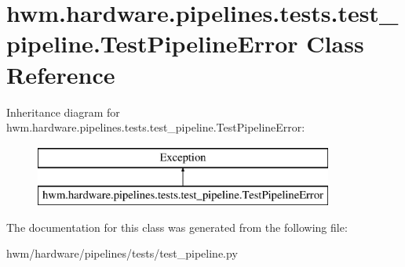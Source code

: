 \hypertarget{classhwm_1_1hardware_1_1pipelines_1_1tests_1_1test__pipeline_1_1_test_pipeline_error}{\section{hwm.\-hardware.\-pipelines.\-tests.\-test\-\_\-pipeline.\-Test\-Pipeline\-Error Class Reference}
\label{classhwm_1_1hardware_1_1pipelines_1_1tests_1_1test__pipeline_1_1_test_pipeline_error}
}
Inheritance diagram for hwm.\-hardware.\-pipelines.\-tests.\-test\-\_\-pipeline.\-Test\-Pipeline\-Error\-:\begin{figure}[H]
\begin{center}
\leavevmode
\includegraphics[height=2.000000cm]{classhwm_1_1hardware_1_1pipelines_1_1tests_1_1test__pipeline_1_1_test_pipeline_error}
\end{center}
\end{figure}


The documentation for this class was generated from the following file\-:\begin{DoxyCompactItemize}
\item 
hwm/hardware/pipelines/tests/test\-\_\-pipeline.\-py\end{DoxyCompactItemize}
